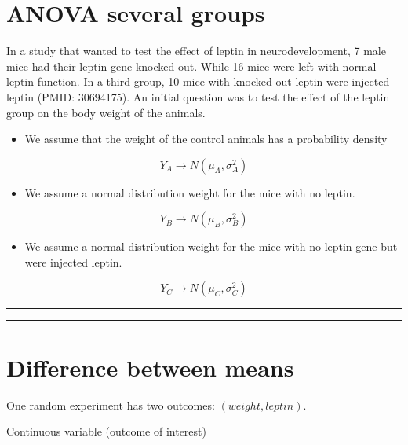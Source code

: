 \documentclass[
]{book}
\providecommand{\tightlist}{%
  \setlength{\itemsep}{0pt}\setlength{\parskip}{0pt}}
\begin{document}
\hypertarget{anova-several-groups-2}{%
\section{ANOVA several groups}\label{anova-several-groups-2}}

In a study that wanted to test the effect of leptin in neurodevelopment, 7 male mice had their leptin gene knocked out. While 16 mice were left with normal leptin function. In a third group, 10 mice with knocked out leptin were injected leptin (PMID: 30694175). An initial question was to test the effect of the leptin group on the body weight of the animals.

\begin{itemize}
\tightlist
\item
  We assume that the weight of the control animals has a probability density
\end{itemize}

\[Y_A \rightarrow N(\mu_A, \sigma_A^2)\]

\begin{itemize}
\tightlist
\item
  We assume a normal distribution weight for the mice with no leptin.
\end{itemize}

\[Y_B \rightarrow N(\mu_B, \sigma_B^2)\]

\begin{itemize}
\tightlist
\item
  We assume a normal distribution weight for the mice with no leptin gene but were injected leptin.
\end{itemize}

\[Y_C \rightarrow N(\mu_C, \sigma_C^2)\]

\begin{center}\rule{0.5\linewidth}{0.5pt}\end{center}

\begin{center}\rule{0.5\linewidth}{0.5pt}\end{center}

\hypertarget{difference-between-means-8}{%
\section{Difference between means}\label{difference-between-means-8}}

One random experiment has two outcomes: \((weight, leptin)\).

Continuous variable (outcome of interest)
\end{document}

